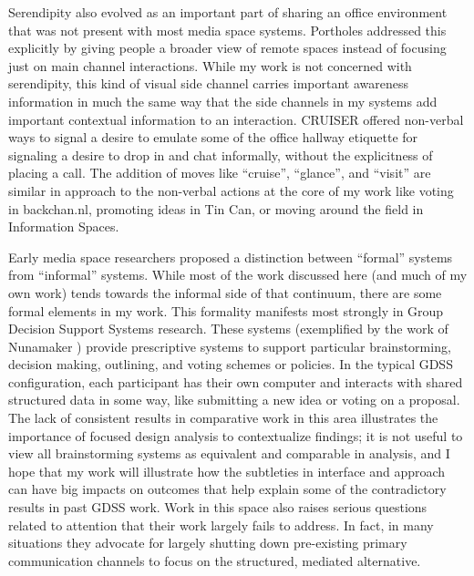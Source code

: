 \documentclass{tufte-handout}
\begin{document}


Serendipity also evolved as an important part of sharing an office environment that was not present with most media space systems. Portholes \citep{Dourish:1992fu} addressed this explicitly by giving people a broader view of remote spaces instead of focusing just on main channel interactions. While my work is not concerned with serendipity, this kind of visual side channel carries important awareness information in much the same way that the side channels in my systems add important contextual information to an interaction. CRUISER \citep{Fish:1992vz} offered non-verbal ways to signal a desire to emulate some of the office hallway etiquette for signaling a desire to drop in and chat informally, without the explicitness of placing a call. The addition of moves like ``cruise'', ``glance'', and ``visit'' are similar in approach to the non-verbal actions at the core of my work like voting in backchan.nl, promoting ideas in Tin Can, or moving around the field in Information Spaces. 

Early media space researchers proposed a distinction between ``formal'' systems from ``informal'' systems. \citep{Olson:1991vz} While most of the work discussed here (and much of my own work) tends towards the informal side of that continuum, there are some formal elements in my work. This formality manifests most strongly in Group Decision Support Systems research. These systems (exemplified by the work of Nunamaker \citep{nunamaker_electronic_1991}) provide prescriptive systems to support particular brainstorming, decision making, outlining, and voting schemes or policies. In the typical GDSS configuration, each participant has their own computer and interacts with shared structured data in some way, like submitting a new idea or voting on a proposal. The lack of consistent results in comparative work in this area \citep{Dennis:1988ww} illustrates the importance of focused design analysis to contextualize findings; it is not useful to view all brainstorming systems as equivalent and comparable in analysis, and I hope that my work will illustrate how the subtleties in interface and approach can have big impacts on outcomes that help explain some of the contradictory results in past GDSS work. Work in this space also raises serious questions related to attention that their work largely fails to address. In fact, in many situations they advocate for largely shutting down pre-existing primary communication channels to focus on the structured, mediated alternative.
\end{document}
